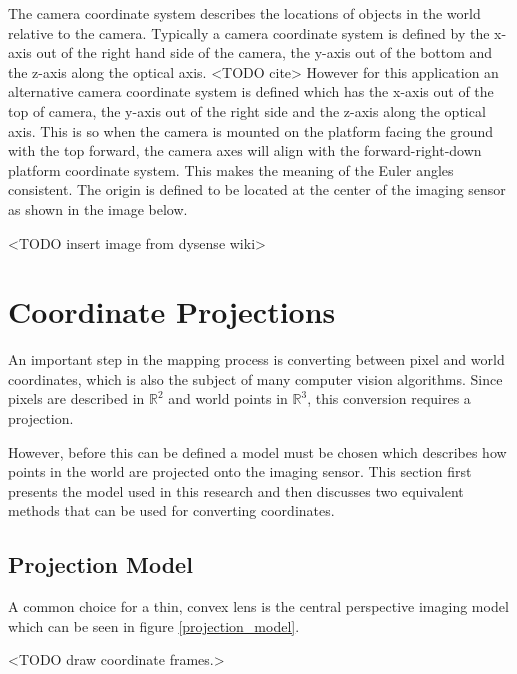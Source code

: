 The camera coordinate system describes the locations of objects in the world relative to the camera.  Typically a camera coordinate system is defined by the x-axis out of the right hand side of the camera, the y-axis out of the bottom and the z-axis along the optical axis.  <TODO cite>   However for this application an alternative camera coordinate system is defined which has the x-axis out of the top of camera, the y-axis out of the right side and the z-axis along the optical axis.  This is so when the camera is mounted on the platform facing the ground with the top forward, the camera axes will align with the forward-right-down platform coordinate system.  This makes the meaning of the Euler angles consistent.  The origin is defined to be located at the center of the imaging sensor as shown in the image below.

<TODO insert image from dysense wiki>

\section{Coordinate Projections}
 
 An important step in the mapping process is converting between pixel and world coordinates, which is also the subject of many computer vision algorithms.  Since pixels are described in $\mathbb{R}^2$ and world points in $\mathbb{R}^3$, this conversion requires a projection.  
 
 However, before this can be defined a model must be chosen which describes how points in the world are projected onto the imaging sensor.  This section first presents the model used in this research and then discusses two equivalent methods that can be used for converting coordinates.  
 
 \subsection{Projection Model}
 
 A common choice for a thin, convex lens is the central perspective imaging model which can be seen in figure \ref{projection_model}. \
 
<TODO draw coordinate frames.>
 
